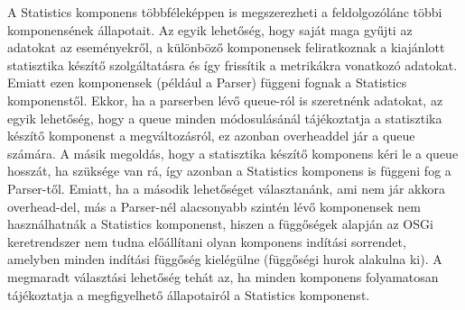 A Statistics komponens többféleképpen is megszerezheti a feldolgozólánc többi komponensének állapotait. Az egyik lehetőség, hogy saját maga gyűjti az adatokat az eseményekről, a különböző komponensek feliratkoznak a kiajánlott statisztika készítő szolgáltatásra és így frissítik a metrikákra vonatkozó adatokat. Emiatt ezen komponensek (például a Parser) függeni fognak a Statistics komponenstől. Ekkor, ha a parserben lévő queue-ról is szeretnénk adatokat, az egyik lehetőség, hogy a queue minden módosulásánál tájékoztatja a statisztika készítő komponenst a megváltozásról, ez azonban overheaddel jár a queue számára. A másik megoldás, hogy a statisztika készítő komponens kéri le a queue hosszát, ha szüksége van rá, így azonban a Statistics komponens is függeni fog a Parser-től. Emiatt, ha a második lehetőséget választanánk, ami nem jár akkora overhead-del, más a Parser-nél alacsonyabb szintén lévő komponensek nem használhatnák a Statistics komponenst, hiszen a függőségek alapján az OSGi keretrendszer nem tudna előállítani olyan komponens indítási sorrendet, amelyben minden indítási függőség kielégülne (függőségi hurok alakulna ki). A megmaradt választási lehetőség tehát az, ha minden komponens folyamatosan tájékoztatja a megfigyelhető állapotairól a Statistics komponenst.


